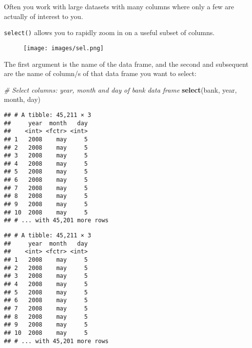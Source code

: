 \documentclass[]{book}
\newenvironment{Shaded}{\begin{snugshade}}{\end{snugshade}}
\newcommand{\KeywordTok}[1]{\textcolor[rgb]{0.13,0.29,0.53}{\textbf{{#1}}}}
\newcommand{\StringTok}[1]{\textcolor[rgb]{0.31,0.60,0.02}{{#1}}}
\newcommand{\CommentTok}[1]{\textcolor[rgb]{0.56,0.35,0.01}{\textit{{#1}}}}
\newcommand{\NormalTok}[1]{{#1}}
\begin{document}
Often you work with large datasets with many columns where only a few
are actually of interest to you.

\texttt{select()} allows you to rapidly zoom in on a useful subset of
columns.

\begin{figure}[htbp]
\centering
\texttt{[image: images/sel.png]}
\caption{}
\end{figure}

The first argument is the name of the data frame, and the second and
subsequent are the name of column/s of that data frame you want to
select:

\begin{Shaded}
\begin{Highlighting}[]
\CommentTok{# Select columns: year, month and day of bank data frame}
\KeywordTok{select}\NormalTok{(bank, year, month, day)}
\end{Highlighting}
\end{Shaded}

\begin{verbatim}
## # A tibble: 45,211 × 3
##     year  month   day
##    <int> <fctr> <int>
## 1   2008    may     5
## 2   2008    may     5
## 3   2008    may     5
## 4   2008    may     5
## 5   2008    may     5
## 6   2008    may     5
## 7   2008    may     5
## 8   2008    may     5
## 9   2008    may     5
## 10  2008    may     5
## # ... with 45,201 more rows
\end{verbatim}

\begin{Shaded}
\end{Shaded}

\begin{verbatim}
## # A tibble: 45,211 × 3
##     year  month   day
##    <int> <fctr> <int>
## 1   2008    may     5
## 2   2008    may     5
## 3   2008    may     5
## 4   2008    may     5
## 5   2008    may     5
## 6   2008    may     5
## 7   2008    may     5
## 8   2008    may     5
## 9   2008    may     5
## 10  2008    may     5
## # ... with 45,201 more rows
\end{verbatim}

\begin{Shaded}
\end{Shaded}
\end{document}
